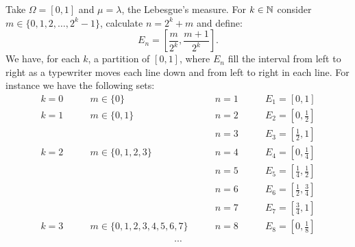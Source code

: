 Take $\Omega = [0, 1]$ and $\mu = \lambda$, the Lebesgue's measure. For $k \in \mathbb N$ consider $m \in \{0,1,2,\ldots,2^k-1\}$, calculate $n = 2^k + m$ and define:
$$E_n = \left[\frac m {2^k},\frac {m+1}{2^k}\right].$$
We have, for each $k$, a partition of $[0,1]$, where $E_n$ fill the interval from left to right as a typewriter moves each line down and from left to right in each line.
For instance we have the following sets:
\begin{align*}
	k=0 \qquad &  m \in \{0\} \qquad & n = 1 \qquad &  E_1= \left[0, 1\right]\\
	k=1 \qquad &  m \in \{0,1\} \qquad & n = 2 \qquad &  E_2= \left[0, \frac 1 2\right]\\
	& & n = 3 \qquad &  E_3= \left[\frac 1 2, 1\right]\\
	k=2 \qquad &  m \in \{0,1,2,3\} \qquad & n = 4 \qquad &  E_4= \left[0, \frac 1 4\right]\\
	& & n = 5 \qquad &  E_5= \left[\frac 1 4,\frac 1 2\right]\\
	& & n = 6 \qquad &  E_6= \left[\frac 1 2, \frac 3 4\right]\\
	& & n = 7 \qquad &  E_7= \left[\frac 3 4, 1\right]\\
	k=3 \qquad &  m \in \{0,1,2,3,4,5,6,7\} \qquad & n = 8 \qquad &  E_8= \left[0, \frac 1 8\right]\\
\end{align*}
$$\cdots$$
	
